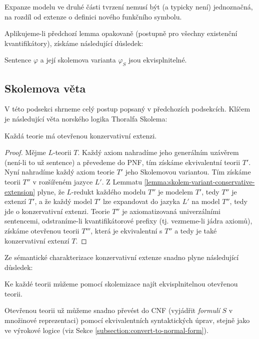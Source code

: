 \begin{remark}
    Expanze modelu ve druhé části tvrzení nemusí být (a typicky není) jednoznačná, na rozdíl od extenze o definici nového funkčního symbolu.
\end{remark}

Aplikujeme-li předchozí lemma opakovaně (postupně pro všechny existenční kvantifikátory), získáme následující důsledek:

\begin{corollary}
    Sentence $\varphi$ a její skolemova varianta $\varphi_S$ jsou ekvisplnitelné.
\end{corollary}


\subsection{Skolemova věta}

V této podsekci shrneme celý postup popsaný v předchozích podsekcích. Klíčem je následující věta norského logika Thoralfa Skolema:

\begin{theorem}
    Každá teorie má otevřenou konzervativní extenzi.
\end{theorem}
\begin{proof}
    Mějme $L$-teorii $T$. Každý axiom nahradíme jeho generálním uzávěrem (není-li to už sentence) a převedeme do PNF, tím získáme ekvivalentní teorii $T'$. Nyní nahradíme každý axiom teorie $T'$ jeho Skolemovou variantou. Tím získáme teorii $T''$ v rozšířeném jazyce $L'$. Z Lemmatu \ref{lemma:skolem-variant-conservative-extension} plyne, že $L$-redukt každého modelu $T''$ je modelem $T'$, tedy $T''$ je extenzí $T'$, a že každý model $T'$ lze expandovat do jazyka $L'$ na model $T''$, tedy jde o konzervativní extenzi. Teorie $T''$ je axiomatizovaná univerzálními sentencemi, odstraníme-li kvantifikátorové prefixy (tj. vezmeme-li jádra axiomů), získáme otevřenou teorii $T'''$, která je ekvivalentní s $T''$ a tedy je také konzervativní extenzí $T$.
\end{proof}

Ze sémantické charakterizace konzervativní extenze snadno plyne následující důsledek:

\begin{corollary}
    Ke každé teorii můžeme pomocí skolemizace najít ekvisplnitelnou otevřenou teorii.
\end{corollary}

Otevřenou teorii už můžeme snadno převést do CNF (vyjádřit \emph{formulí} $S$ v množinové reprezentaci) pomocí ekvivalentních syntaktických úprav, stejně jako ve výrokové logice (viz Sekce \ref{subsection:convert-to-normal-form}).


